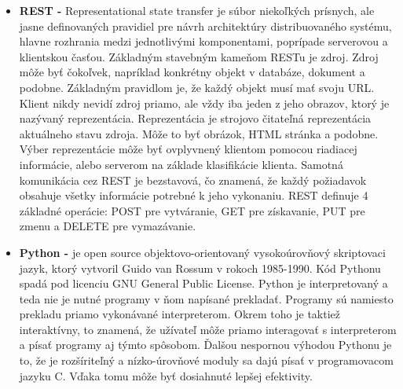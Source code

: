 \begin{itemize}
    \item \textbf{REST -} Representational state transfer je súbor niekoľkých prísnych, ale jasne definovaných pravidiel pre návrh architektúry distribuovaného systému, hlavne rozhrania medzi jednotlivými komponentami, poprípade serverovou a klientskou časťou. Základným stavebným kameňom RESTu je zdroj. Zdroj môže byť čokoľvek, napríklad konkrétny objekt v databáze, dokument a podobne. Základným pravidlom je, že každý objekt musí mať svoju URL. Klient nikdy nevidí zdroj priamo, ale vždy iba jeden z jeho obrazov, ktorý je nazývaný reprezentácia. Reprezentácia je strojovo čitateľná reprezentácia aktuálneho stavu zdroja. Môže to byť obrázok, HTML stránka a podobne. Výber reprezentácie môže byť ovplyvnený klientom pomocou riadiacej informácie, alebo serverom na základe klasifikácie klienta. Samotná komunikácia cez REST je bezstavová, čo znamená, že každý požiadavok obsahuje všetky informácie potrebné k jeho vykonaniu. REST definuje 4 základné operácie: POST pre vytváranie, GET pre získavanie, PUT pre zmenu a DELETE pre vymazávanie. \cite{Allamarajuc2010, 54r2mhdAeuyxzZPp}
    \item \textbf{Python -} je open source objektovo-orientovaný vysokoúrovňový skriptovaci jazyk, ktorý vytvoril Guido van Rossum v rokoch 1985-1990. Kód Pythonu spadá pod licenciu GNU General Public License. Python je interpretovaný a teda nie je nutné programy v ňom napísané prekladať. Programy sú namiesto prekladu priamo vykonávané interpreterom. Okrem toho je taktiež interaktívny, to znamená, že užívateľ môže priamo interagovať s interpreterom a písať programy aj týmto spôsobom. Ďalšou nespornou výhodou Pythonu je to, že je rozšíriteľný a nízko-úrovňové moduly sa dajú písať v programovacom jazyku C. Vďaka tomu môže byť dosiahnuté lepšej efektivity. \cite{CCnsn576LIGBCH2C}
    

\end{itemize}
